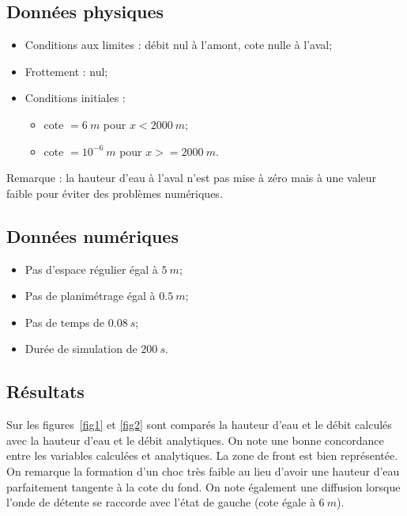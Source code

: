 \documentclass[a4paper,10pt]{article}
\begin{document}
\subsection*{Données physiques}

\begin{itemize} 
 \item Conditions aux limites : débit nul à l'amont, cote nulle à l'aval;
 \item Frottement : nul;
 \item Conditions initiales :
 \begin{itemize}
  \item cote $= 6\ m$ pour $x < 2000\ m$;
  \item cote $= 10^{-6}\ m$ pour $x >= 2000\ m$.
 \end{itemize}
\end{itemize} 

Remarque : la hauteur d'eau à l'aval n'est pas mise à zéro mais à une valeur faible pour éviter des problèmes numériques.

\subsection*{Données numériques}

\begin{itemize}
 \item Pas d'espace régulier égal à $5\ m$;
 \item Pas de planimétrage égal à $0.5\ m$;
 \item Pas de temps de $0.08\ s$;
 \item Durée de simulation de $200\ s$.
\end{itemize}


\subsection*{Résultats}

Sur les figures~\ref{fig1} et \ref{fig2} sont comparés la hauteur d'eau et le débit calculés avec la hauteur d'eau et le débit analytiques. On note une bonne concordance entre les variables calculées et analytiques. La zone de front est bien représentée. On remarque la formation d'un choc très faible au lieu d'avoir une hauteur d'eau parfaitement tangente à la cote du fond. On note également une diffusion lorsque l'onde de détente se raccorde avec l'état de gauche (cote égale à $6\ m$).




\newpage
\end{document}
